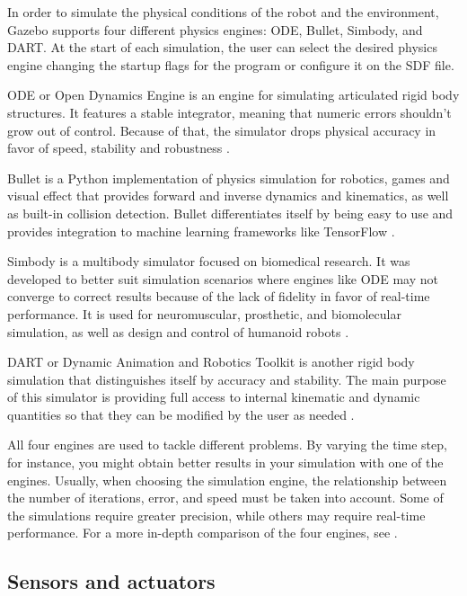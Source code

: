 In order to simulate the physical conditions of the robot and the environment, Gazebo supports four different physics engines: ODE, Bullet, Simbody, and DART. At the start of each simulation, the user can select the desired physics engine changing the startup flags for the program or configure it on the SDF file.

ODE or Open Dynamics Engine is an engine for simulating articulated rigid body structures. It features a stable integrator, meaning that numeric errors shouldn't grow out of control. Because of that, the simulator drops physical accuracy in favor of speed, stability and robustness \cite{smith2005open}.

Bullet is a Python implementation of physics simulation for robotics, games and visual effect that provides forward and inverse dynamics and kinematics, as well as built-in collision detection. Bullet differentiates itself by being easy to use and provides integration to machine learning frameworks like TensorFlow \cite{coumans2018}.

Simbody is a multibody simulator focused on biomedical research. It was developed to better suit simulation scenarios where engines like ODE may not converge to correct results because of the lack of fidelity in favor of real-time performance. It is used for neuromuscular, prosthetic, and biomolecular simulation, as well as design and control of humanoid robots \cite{sherman2011simbody}.

DART or Dynamic Animation and Robotics Toolkit is another rigid body simulation that distinguishes itself by accuracy and stability. The main purpose of this simulator is providing full access to internal kinematic and dynamic quantities so that they can be modified by the user as needed \cite{lee2018dart}.

All four engines are used to tackle different problems. By varying the time step, for instance, you might obtain better results in your simulation with one of the engines. Usually, when choosing the simulation engine, the relationship between the number of iterations, error, and speed must be taken into account. Some of the simulations require greater precision, while others may require real-time performance. For a more in-depth comparison of the four engines, see \cite{peters2014comparison}.

\subsection{Sensors and actuators}

